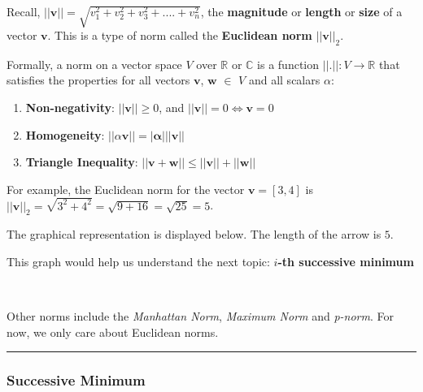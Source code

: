 \documentclass[11pt]{article}
\begin{document}
Recall,
\(||{\mathbf{v}}|| = \sqrt{v_1^2 + v_2^2 + v_3^2 + .... + v_n^2}\), the
\textbf{magnitude} or \textbf{length} or \textbf{size} of a vector
\({\mathbf{v}}\). This is a type of norm called the \textbf{Euclidean
norm} \(||\mathbf{v}||_2\).

Formally, a norm on a vector space \(V\) over \(\mathbb{R}\) or
\(\mathbb{C}\) is a function \(||.||:V \to \mathbb{R}\) that satisfies
the properties for all vectors \(\mathbf{v}\), \(\mathbf{w}\) \(\in\)
\(V\) and all scalars \(\alpha\):

\begin{enumerate}
\def\labelenumi{\arabic{enumi}.}
\item
  \textbf{Non-negativity}: \(||\mathbf{v}|| \geq 0\), and
  \(||\mathbf{v}|| = 0 \iff \mathbf{v} = 0\)
\item
  \textbf{Homogeneity}:
  \(||\alpha \mathbf{v}|| = |\mathbf{\alpha}|||\mathbf{v}||\)
\item
  \textbf{Triangle Inequality}:
  \(||\mathbf{v} + \mathbf{w}|| \leq ||\mathbf{v}|| + ||\mathbf{w}||\)
\end{enumerate}

For example, the Euclidean norm for the vector \(\mathbf{v} = [3, 4]\)
is
\(||\mathbf{v}||_2 = \sqrt{3^2 + 4^2} = \sqrt{9 + 16} = \sqrt{25} = 5\).

The graphical representation is displayed below. The length of the arrow
is \(5\).

This graph would help us understand the next topic:
\textbf{\emph{\(i\)}-th successive minimum}

    \begin{center}
    \end{center}
    { \hspace*{\fill} \\}
    
    Other norms include the \emph{Manhattan Norm}, \emph{Maximum Norm} and
\emph{p-norm}. For now, we only care about Euclidean norms.

\begin{center}\rule{0.5\linewidth}{0.5pt}\end{center}

    \subsubsection{Successive Minimum}\label{successive-minimum}
\end{document}

